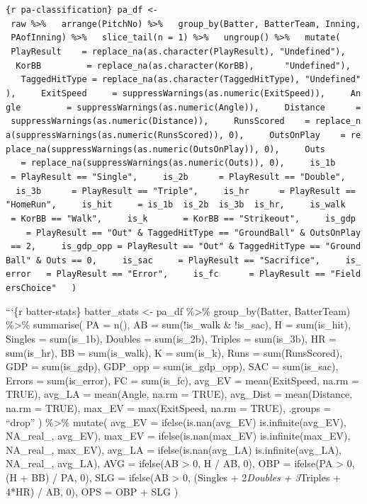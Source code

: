 \documentclass[
]{article}
\begin{document}
\texttt{\{r\ pa-classification\}\ pa\_df\ \textless{}-\ raw\ \%\textgreater{}\%\ \ \ arrange(PitchNo)\ \%\textgreater{}\%\ \ \ group\_by(Batter,\ BatterTeam,\ Inning,\ PAofInning)\ \%\textgreater{}\%\ \ \ slice\_tail(n\ =\ 1)\ \%\textgreater{}\%\ \ \ ungroup()\ \%\textgreater{}\%\ \ \ mutate(\ \ \ \ \ PlayResult\ \ \ \ =\ replace\_na(as.character(PlayResult),\ "Undefined"),\ \ \ \ \ KorBB\ \ \ \ \ \ \ \ \ =\ replace\_na(as.character(KorBB),\ \ \ \ \ \ "Undefined"),\ \ \ \ \ TaggedHitType\ =\ replace\_na(as.character(TaggedHitType),\ "Undefined"),\ \ \ \ \ ExitSpeed\ \ \ \ \ =\ suppressWarnings(as.numeric(ExitSpeed)),\ \ \ \ \ Angle\ \ \ \ \ \ \ \ \ =\ suppressWarnings(as.numeric(Angle)),\ \ \ \ \ Distance\ \ \ \ \ \ =\ suppressWarnings(as.numeric(Distance)),\ \ \ \ \ RunsScored\ \ \ \ =\ replace\_na(suppressWarnings(as.numeric(RunsScored)),\ 0),\ \ \ \ \ OutsOnPlay\ \ \ \ =\ replace\_na(suppressWarnings(as.numeric(OutsOnPlay)),\ 0),\ \ \ \ \ Outs\ \ \ \ \ \ \ \ \ \ =\ replace\_na(suppressWarnings(as.numeric(Outs)),\ 0),\ \ \ \ \ is\_1b\ \ \ \ \ \ =\ PlayResult\ ==\ "Single",\ \ \ \ \ is\_2b\ \ \ \ \ \ =\ PlayResult\ ==\ "Double",\ \ \ \ \ is\_3b\ \ \ \ \ \ =\ PlayResult\ ==\ "Triple",\ \ \ \ \ is\_hr\ \ \ \ \ \ =\ PlayResult\ ==\ "HomeRun",\ \ \ \ \ is\_hit\ \ \ \ \ =\ is\_1b\ \textbar{}\ is\_2b\ \textbar{}\ is\_3b\ \textbar{}\ is\_hr,\ \ \ \ \ is\_walk\ \ \ \ =\ KorBB\ ==\ "Walk",\ \ \ \ \ is\_k\ \ \ \ \ \ \ =\ KorBB\ ==\ "Strikeout",\ \ \ \ \ is\_gdp\ \ \ \ \ =\ PlayResult\ ==\ "Out"\ \&\ TaggedHitType\ ==\ "GroundBall"\ \&\ OutsOnPlay\ ==\ 2,\ \ \ \ \ is\_gdp\_opp\ =\ PlayResult\ ==\ "Out"\ \&\ TaggedHitType\ ==\ "GroundBall"\ \&\ Outs\ ==\ 0,\ \ \ \ \ is\_sac\ \ \ \ \ =\ PlayResult\ ==\ "Sacrifice",\ \ \ \ \ is\_error\ \ \ =\ PlayResult\ ==\ "Error",\ \ \ \ \ is\_fc\ \ \ \ \ \ =\ PlayResult\ ==\ "FieldersChoice"\ \ \ )}

```\{r batter-stats\} batter\_stats \textless- pa\_df \%\textgreater\%
group\_by(Batter, BatterTeam) \%\textgreater\% summarise( PA = n(), AB =
sum(!is\_walk \& !is\_sac), H = sum(is\_hit), Singles = sum(is\_1b),
Doubles = sum(is\_2b), Triples = sum(is\_3b), HR = sum(is\_hr), BB =
sum(is\_walk), K = sum(is\_k), Runs = sum(RunsScored), GDP =
sum(is\_gdp), GDP\_opp = sum(is\_gdp\_opp), SAC = sum(is\_sac), Errors =
sum(is\_error), FC = sum(is\_fc), avg\_EV = mean(ExitSpeed, na.rm =
TRUE), avg\_LA = mean(Angle, na.rm = TRUE), avg\_Dist = mean(Distance,
na.rm = TRUE), max\_EV = max(ExitSpeed, na.rm = TRUE), .groups =
``drop'' ) \%\textgreater\% mutate( avg\_EV = ifelse(is.nan(avg\_EV)
\textbar{} is.infinite(avg\_EV), NA\_real\_, avg\_EV), max\_EV =
ifelse(is.nan(max\_EV) \textbar{} is.infinite(max\_EV), NA\_real\_,
max\_EV), avg\_LA = ifelse(is.nan(avg\_LA) \textbar{}
is.infinite(avg\_LA), NA\_real\_, avg\_LA), AVG = ifelse(AB
\textgreater{} 0, H / AB, 0), OBP = ifelse(PA \textgreater{} 0, (H + BB)
/ PA, 0), SLG = ifelse(AB \textgreater{} 0, (Singles + 2\emph{Doubles +
3}Triples + 4*HR) / AB, 0), OPS = OBP + SLG )
\end{document}
